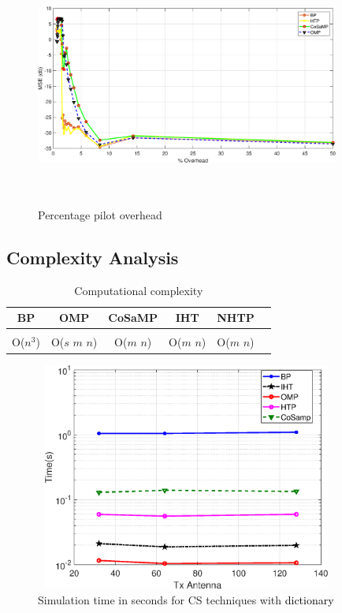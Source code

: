 	\begin{figure}
		\centering
		\includegraphics[width=100mm,height=80mm]{figures/figchap4/pilot_over.eps}
		\caption{Percentage pilot overhead}	
		\label{Fig_result7}
	\end{figure}
\subsection{Complexity Analysis}
\label{ComplexAnalysis}

\begin{table} \footnotesize
	\renewcommand{\arraystretch}{1.1}
	\caption{Computational complexity}
	\label{tabComplexity}
	\centering
	\begin{tabular}{cccccc}
		\textbf{BP}&\textbf{OMP}&\textbf{CoSaMP}&\textbf{IHT}&\textbf{NHTP}\\
		\hline
		\\
		O($n^3$)&O($s$ $m$ $n$)&O($m$ $n$)&O($m$ $n$)&O($m$ $n$)\\		
	\end{tabular}
\end{table}

\begin{figure}
	\centering
   \includegraphics[width=100mm,height=75mm]{figures/figchap4/antennavstime_semilog.eps}
	\caption{Simulation time in seconds for CS techniques with \textcolor{black}{dictionary}}
	\label{FigComplex}      
\end{figure}



